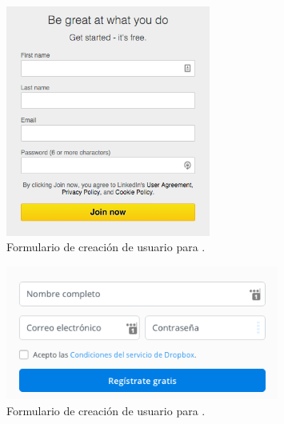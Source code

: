 \begin{figure}[H]
	\centering
	\includegraphics[width=0.6\textwidth]{figuras/account/examples/linkedin_create_form.png}
	\caption{Formulario de creación de usuario para \linkedInNAME.}
	\label{figure:apendice:account:example:linkedin_create_form}
\end{figure}

\begin{figure}[H]
	\centering
	\includegraphics[width=0.8\textwidth]{figuras/account/examples/dropbox_create_form.png}
	\caption{Formulario de creación de usuario para \dropboxNAME.}
	\label{figure:apendice:account:example:dropbox_create_form}
\end{figure}